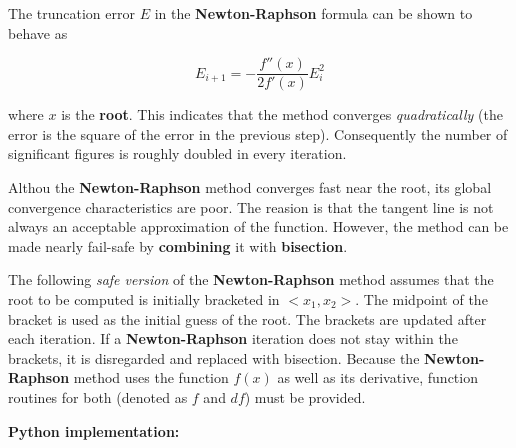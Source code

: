 The truncation error $ E $ in the \textbf{Newton-Raphson} formula can be shown to
behave as

\begin{equation}
    E_{i+1} = - \frac{f''(x)}{2f'(x)}E_i^2
\end{equation}

where $ x $ is the \textbf{root}. This indicates that the method converges
\textit{quadratically} (the error is the square of the error in the previous step).
Consequently the number of significant figures is roughly doubled in every
iteration.

Althou the \textbf{Newton-Raphson} method converges fast near the root, its global
convergence characteristics are poor. The reasion is that the tangent line is
not always an acceptable approximation of the function. However, the method can be
made nearly fail-safe by \textbf{combining} it with \textbf{bisection}.

The following \textit{safe version} of the \textbf{Newton-Raphson} method assumes
that the root to be computed is initially bracketed in $ <x_1, x_2> $.
The midpoint of the bracket is used as the initial guess of the root. The brackets
are updated after each iteration. If a \textbf{Newton-Raphson} iteration does not
stay within the brackets, it is disregarded and replaced with bisection.
Because the \textbf{Newton-Raphson} method uses the function $ f(x) $ as well as its
derivative, function routines for both (denoted as $ f $ and $ df $) must be provided.

\textbf{Python implementation:}

